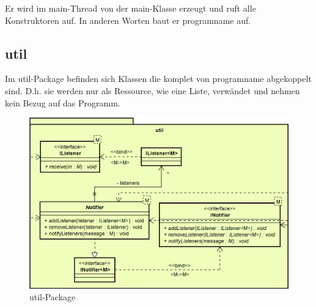 Er wird im main-Thread von der main-Klasse erzeugt und ruft alle Konstruktoren auf.
In anderen Worten baut er \gls{programname} auf.

\subsection{util}
\label{subsec:util}

Im util-Package befinden sich Klassen die komplet von \gls{programname} abgekoppelt
sind. D.h. sie werden nur als Ressource, wie eine Liste, verwändet und nehmen kein
Bezug auf das Programm.

\begin{figure}[H]
  \centering
  \includegraphics[width=\textwidth]{../diagramimages/util.png}
  \caption{util-Package}
\end{figure}

